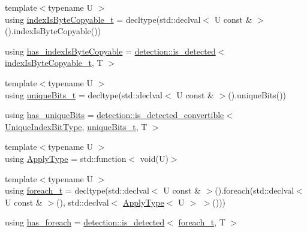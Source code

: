 \begin{DoxyCompactItemize}
\item 
{\footnotesize template$<$typename U $>$ }\\using \hyperlink{structvt_1_1index_1_1_index_traits_a67b716eec3bb224751d83b4f1e4d61fc}{index\+Is\+Byte\+Copyable\+\_\+t} = decltype(std\+::declval$<$ U const  \& $>$().index\+Is\+Byte\+Copyable())
\item 
using \hyperlink{structvt_1_1index_1_1_index_traits_ab2daf95703112e971bfc12704a1fa141}{has\+\_\+index\+Is\+Byte\+Copyable} = \hyperlink{namespacedetection_a30893549a3de1e9603d78dad6d5dce92}{detection\+::is\+\_\+detected}$<$ \hyperlink{structvt_1_1index_1_1_index_traits_a67b716eec3bb224751d83b4f1e4d61fc}{index\+Is\+Byte\+Copyable\+\_\+t}, T $>$
\item 
{\footnotesize template$<$typename U $>$ }\\using \hyperlink{structvt_1_1index_1_1_index_traits_ac56a2e3919488b64e42a60e1684623aa}{unique\+Bits\+\_\+t} = decltype(std\+::declval$<$ U const  \& $>$().unique\+Bits())
\item 
using \hyperlink{structvt_1_1index_1_1_index_traits_a6862d0422947a4835262b170637b462d}{has\+\_\+unique\+Bits} = \hyperlink{namespacedetection_afb970b23e39cfecb33449d40242c49ff}{detection\+::is\+\_\+detected\+\_\+convertible}$<$ \hyperlink{namespacevt_a913e1f07b5228dd8bb64040dc6dcea14}{Unique\+Index\+Bit\+Type}, \hyperlink{structvt_1_1index_1_1_index_traits_ac56a2e3919488b64e42a60e1684623aa}{unique\+Bits\+\_\+t}, T $>$
\item 
{\footnotesize template$<$typename U $>$ }\\using \hyperlink{structvt_1_1index_1_1_index_traits_ab13467c0c40bb0f17103d108cd08437f}{Apply\+Type} = std\+::function$<$ void(U)$>$
\item 
{\footnotesize template$<$typename U $>$ }\\using \hyperlink{structvt_1_1index_1_1_index_traits_a132ed4a131bbc5f9e410e203cf2e08ae}{foreach\+\_\+t} = decltype(std\+::declval$<$ U const  \& $>$().foreach(std\+::declval$<$ U const  \& $>$(), std\+::declval$<$ \hyperlink{structvt_1_1index_1_1_index_traits_ab13467c0c40bb0f17103d108cd08437f}{Apply\+Type}$<$ U $>$ $>$()))
\item 
using \hyperlink{structvt_1_1index_1_1_index_traits_ae82fe931c4bbe8201d4dc72f07ceb42d}{has\+\_\+foreach} = \hyperlink{namespacedetection_a30893549a3de1e9603d78dad6d5dce92}{detection\+::is\+\_\+detected}$<$ \hyperlink{structvt_1_1index_1_1_index_traits_a132ed4a131bbc5f9e410e203cf2e08ae}{foreach\+\_\+t}, T $>$
\item 

\end{DoxyCompactItemize}
